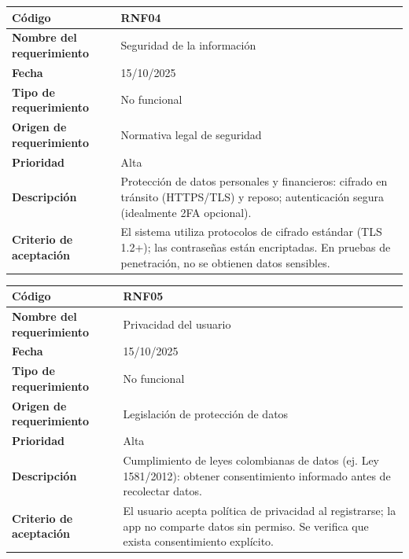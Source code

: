 \begin{table}[H]
	\begin{tabular}{|s{5cm}|m{11cm}|}
		\hline
		\textbf{Código} & RNF04 \\ \hline
		\textbf{Nombre del requerimiento} & Seguridad de la información \\ \hline
		\textbf{Fecha} & 15/10/2025 \\ \hline
		\textbf{Tipo de requerimiento} & No funcional \\ \hline
		\textbf{Origen de requerimiento} & Normativa legal de seguridad \\ \hline
		\textbf{Prioridad} & Alta \\ \hline
		\textbf{Descripción} & Protección de datos personales y financieros: cifrado en tránsito (HTTPS/TLS) y reposo; autenticación segura (idealmente 2FA opcional). \\ \hline
		\textbf{Criterio de aceptación} & El sistema utiliza protocolos de cifrado estándar (TLS 1.2+); las contraseñas están encriptadas. En pruebas de penetración, no se obtienen datos sensibles. \\ \hline
	\end{tabular}
\end{table}

\begin{table}[H]
	\begin{tabular}{|s{5cm}|m{11cm}|}
		\hline
		\textbf{Código} & RNF05 \\ \hline
		\textbf{Nombre del requerimiento} & Privacidad del usuario \\ \hline
		\textbf{Fecha} & 15/10/2025 \\ \hline
		\textbf{Tipo de requerimiento} & No funcional \\ \hline
		\textbf{Origen de requerimiento} & Legislación de protección de datos \\ \hline
		\textbf{Prioridad} & Alta \\ \hline
		\textbf{Descripción} & Cumplimiento de leyes colombianas de datos (ej. Ley 1581/2012): obtener consentimiento informado antes de recolectar datos. \\ \hline
		\textbf{Criterio de aceptación} & El usuario acepta política de privacidad al registrarse; la app no comparte datos sin permiso. Se verifica que exista consentimiento explícito. \\ \hline
	\end{tabular}
\end{table}

